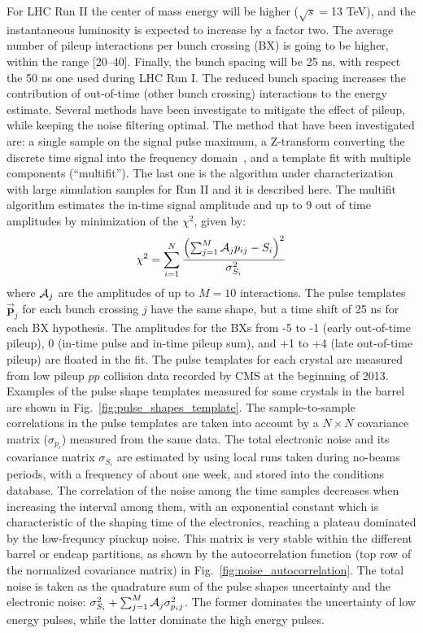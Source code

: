 \documentclass[journal]{IEEEtran}
\begin{document}
For LHC Run II the center of mass energy will be higher ($\sqrt{s}=$13 TeV), and the instantaneous luminosity is expected to increase by a factor two. The average number of pileup interactions per bunch crossing (BX) is going to be higher, within the range [20--40]. Finally, the bunch spacing will be 25 ns, with respect the 50 ns one used during LHC Run I. The reduced bunch spacing increases the contribution of out-of-time (other bunch crossing) interactions to the energy estimate. Several methods have been investigate to mitigate the effect of pileup, while keeping the noise filtering optimal. The method that have been investigated are: a single sample on the signal pulse maximum, a Z-transform converting the discrete time signal into the frequency domain~\cite{Gadomski:1992xu}, and a template fit with multiple components (``multifit''). The last one is the algorithm under characterization with large simulation samples for Run II and it is described here.
The multifit algorithm estimates the in-time signal amplitude and up to 9 out of time amplitudes by minimization of the $\chi^2$, given by:
\begin{equation}
\label{eqn:chi2multifit}
\chi^2 = \sum_{i=1}^{N} \frac{\left(\sum_{j=1}^M {\cal A}_{j}p_{ij} - S_i \right)^2}{\sigma^2_{S_i}}
\end{equation}
where ${\cal A}_{j}$ are the amplitudes of up to $M=10$ interactions. The pulse templates $\mathbf{\vec p}_j$ for each bunch crossing $j$ have the same shape, but a time shift of 25 ns for each BX hypothesis. The amplitudes for the BXs from -5 to -1 (early out-of-time pileup), 0 (in-time pulse and in-time pileup sum), and +1 to +4 (late out-of-time pileup) are floated in the fit.
The pulse templates for each crystal are measured from low pileup $pp$ collision data recorded by CMS at the beginning of 2013. Examples of the pulse shape templates measured for some crystals in the barrel are shown in Fig.~\ref{fig:pulse_shapes_template}. The sample-to-sample correlations in the pulse templates are taken into account by a $N \times N$ covariance matrix ($\sigma_{p_i}$) measured from the same data. The total electronic noise and its covariance matrix $\sigma_{S_i}$ are estimated by using local runs taken during no-beams periods, with a frequency of about one week, and stored into the conditions database. The correlation of the noise among the time samples decreases when increasing the interval among them, with an exponential constant which is characteristic of the shaping time of the electronics, reaching a plateau dominated by the low-frequncy piuckup noise. This matrix is very stable within the different barrel or endcap partitions, as shown by the autocorrelation function (top row of the normalized covariance matrix) in Fig.~\ref{fig:noise_autocorrelation}. The total noise is taken as the quadrature sum of the pulse shapes uncertainty and the electronic noise: $\sigma_{S_i}^2+\sum_{j=1}^M {\cal A}_{j}\sigma_{p_ij}^2$. The former dominates the uncertainty of low energy pulses, while the latter dominate the high energy pulses.
\end{document}
